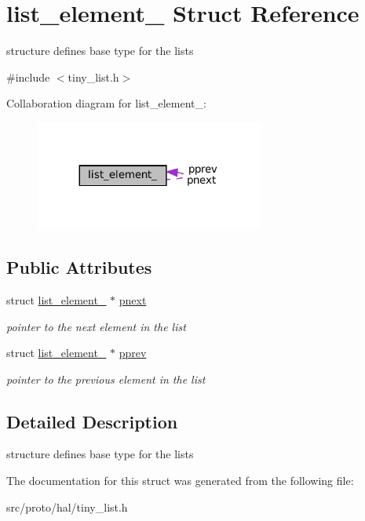 \hypertarget{structlist__element__}{}\section{list\+\_\+element\+\_\+ Struct Reference}
\label{structlist__element__}


structure defines base type for the lists  




{\ttfamily \#include $<$tiny\+\_\+list.\+h$>$}



Collaboration diagram for list\+\_\+element\+\_\+\+:
\nopagebreak
\begin{figure}[H]
\begin{center}
\leavevmode
\includegraphics[width=212pt]{structlist__element____coll__graph}
\end{center}
\end{figure}
\subsection*{Public Attributes}
\begin{DoxyCompactItemize}
\item 
\mbox{\label{structlist__element___a81cb2c54606be8120460bded0d919039}} 
struct \hyperlink{structlist__element__}{list\+\_\+element\+\_\+} $\ast$ \hyperlink{structlist__element___a81cb2c54606be8120460bded0d919039}{pnext}
\begin{DoxyCompactList}\small\item\em pointer to the next element in the list \end{DoxyCompactList}\item 
\mbox{\label{structlist__element___a0f6c573966c9d70d4a2ef19b73717515}} 
struct \hyperlink{structlist__element__}{list\+\_\+element\+\_\+} $\ast$ \hyperlink{structlist__element___a0f6c573966c9d70d4a2ef19b73717515}{pprev}
\begin{DoxyCompactList}\small\item\em pointer to the previous element in the list \end{DoxyCompactList}\end{DoxyCompactItemize}


\subsection{Detailed Description}
structure defines base type for the lists 

The documentation for this struct was generated from the following file\+:\begin{DoxyCompactItemize}
\item 
src/proto/hal/tiny\+\_\+list.\+h\end{DoxyCompactItemize}
